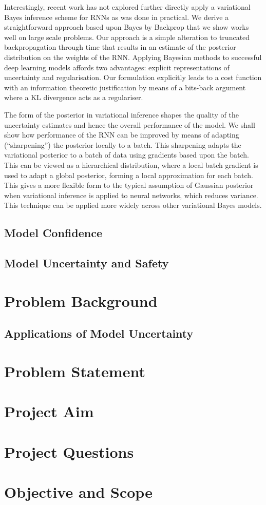 Interestingly, recent work has not explored further directly apply a variational Bayes inference scheme for RNNs as was done in practical.
We derive a straightforward approach based upon Bayes by Backprop \cite{Blundell2015a} that we show works well on large scale problems.
Our approach is a simple alteration to truncated backpropagation through time that results in an estimate of the posterior distribution on the weights of the RNN.
Applying Bayesian methods to successful deep learning models affords two advantages: explicit representations of uncertainty and regularisation.
Our formulation explicitly leads to a cost function with an information theoretic justification by means of a bits-back argument \cite{Hinton1993} where a KL divergence acts as a regulariser.

The form of the posterior in variational inference shapes the quality of the uncertainty estimates and hence the overall performance of the model.
We shall show how performance of the RNN can be improved by means of adapting (``sharpening'') the posterior locally to a batch.
This sharpening adapts the variational posterior to a batch of data using gradients based upon the batch.
This can be viewed as a hierarchical distribution, where a local batch gradient is used to adapt a global posterior, forming a local approximation for each batch.
This gives a more flexible form  to the typical assumption of Gaussian posterior when variational inference is applied to neural networks, which reduces variance. This technique can be applied more widely across other variational Bayes models.

\subsection{Model Confidence}
\subsection{Model Uncertainty and Safety}

\section{Problem Background}
\subsection{Applications of Model Uncertainty}

\section{Problem Statement}

\section{Project Aim}

\section{Project Questions}

\section{Objective and Scope}

